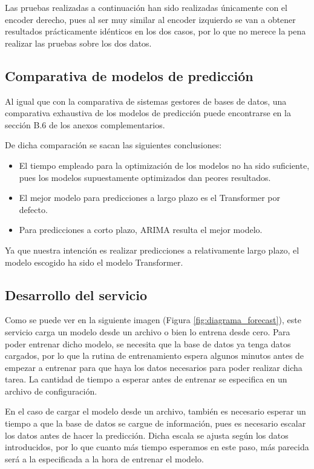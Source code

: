 Las pruebas realizadas a continuación han sido realizadas únicamente con el encoder derecho, pues al ser muy similar 
al encoder izquierdo se van a obtener resultados prácticamente idénticos en los dos casos, por lo que no merece 
la pena realizar las pruebas sobre los dos datos.

\subsection{Comparativa de modelos de predicción}


Al igual que con la comparativa de sistemas gestores de bases de datos, una comparativa exhaustiva de los modelos 
de predicción puede encontrarse en la sección B.6 de los anexos complementarios.

De dicha comparación se sacan las siguientes conclusiones:
\begin{itemize}
    \item El tiempo empleado para la optimización de los modelos no ha sido suficiente, pues los modelos
        supuestamente optimizados dan peores resultados.
    \item El mejor modelo para predicciones a largo plazo es el Transformer por defecto. %
    \item Para predicciones a corto plazo, ARIMA resulta el mejor modelo.
\end{itemize}

Ya que nuestra intención es realizar predicciones a relativamente largo plazo, el modelo escogido ha sido el modelo 
Transformer.



\subsection{Desarrollo del servicio}

Como se puede ver en la siguiente imagen (Figura \ref{fig:diagrama_forecast}), este servicio carga un modelo desde 
un archivo o bien lo entrena desde cero. Para poder entrenar dicho modelo, se necesita que la base de datos ya tenga 
datos cargados, por lo que la rutina de entrenamiento espera algunos minutos antes de empezar a entrenar para que 
haya los datos necesarios para poder realizar dicha tarea. La cantidad de tiempo a esperar antes de entrenar se especifica 
en un archivo de configuración.

En el caso de cargar el modelo desde un archivo, también es necesario esperar un tiempo a que la base de datos se cargue 
de información, pues es necesario escalar los datos antes de hacer la predicción. Dicha escala se ajusta según los datos 
introducidos, por lo que cuanto más tiempo esperamos en este paso, más parecida será a la especificada a la hora
de entrenar el modelo.

